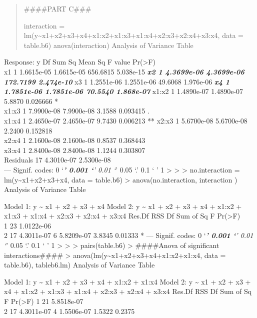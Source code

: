 \documentclass[
]{article}
\begin{document}
\begin{quote}
\#\#\#\#PART C\#\#\#

interaction =
lm(y\textasciitilde x1+x2+x3+x4+x1:x2+x1:x3+x1:x4+x2:x3+x2:x4+x3:x4,
data = table.b6) anova(interaction) Analysis of Variance Table
\end{quote}

Response: y Df Sum Sq Mean Sq F value Pr(\textgreater F)\\
x1 1 1.6615e-05 1.6615e-05 656.6815 5.038e-15 \textbf{\emph{ x2 1
4.3699e-06 4.3699e-06 172.7199 2.474e-10 }} x3 1 1.2551e-06 1.2551e-06
49.6068 1.976e-06 \textbf{\emph{ x4 1 1.7851e-06 1.7851e-06 70.5540
1.868e-07 }} x1:x2 1 1.4890e-07 1.4890e-07 5.8870 0.026666 *\\
x1:x3 1 7.9900e-08 7.9900e-08 3.1588 0.093415 .\\
x1:x4 1 2.4650e-07 2.4650e-07 9.7430 0.006213 ** x2:x3 1 5.6700e-08
5.6700e-08 2.2400 0.152818\\
x2:x4 1 2.1600e-08 2.1600e-08 0.8537 0.368443\\
x3:x4 1 2.8400e-08 2.8400e-08 1.1244 0.303807\\
Residuals 17 4.3010e-07 2.5300e-08\\
--- Signif. codes: 0 `\emph{\textbf{' 0.001 `}' 0.01 `}' 0.05 `.' 0.1 `
' 1 \textgreater{} \textgreater{} \textgreater{} no.interaction =
lm(y\textasciitilde x1+x2+x3+x4, data = table.b6) \textgreater{}
anova(no.interaction, interaction ) Analysis of Variance Table

Model 1: y \textasciitilde{} x1 + x2 + x3 + x4 Model 2: y
\textasciitilde{} x1 + x2 + x3 + x4 + x1:x2 + x1:x3 + x1:x4 + x2:x3 +
x2:x4 + x3:x4 Res.Df RSS Df Sum of Sq F Pr(\textgreater F)\\
1 23 1.0122e-06\\
2 17 4.3011e-07 6 5.8209e-07 3.8345 0.01333 * --- Signif. codes: 0
`\emph{\textbf{' 0.001 `}' 0.01 `}' 0.05 `.' 0.1 ` ' 1 \textgreater{}
\textgreater{} \textgreater{} pairs(table.b6) \textgreater{}
\#\#\#\#Anova of significant interactions\#\#\#\# \textgreater{}
anova(lm(y\textasciitilde x1+x2+x3+x4+x1:x2+x1:x4, data = table.b6),
tableb6.lm) Analysis of Variance Table

Model 1: y \textasciitilde{} x1 + x2 + x3 + x4 + x1:x2 + x1:x4 Model 2:
y \textasciitilde{} x1 + x2 + x3 + x4 + x1:x2 + x1:x3 + x1:x4 + x2:x3 +
x2:x4 + x3:x4 Res.Df RSS Df Sum of Sq F Pr(\textgreater F) 1 21
5.8518e-07\\
2 17 4.3011e-07 4 1.5506e-07 1.5322 0.2375
\end{document}
